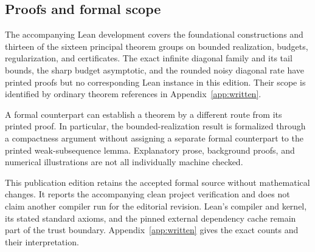 \documentclass[11pt]{article}
\begin{document}
\subsection*{Proofs and formal scope}
The accompanying Lean development covers the foundational constructions and thirteen of the sixteen principal theorem groups on bounded realization, budgets, regularization, and certificates. The exact infinite diagonal family and its tail bounds, the sharp budget asymptotic, and the rounded noisy diagonal rate have printed proofs but no corresponding Lean instance in this edition. Their scope is identified by ordinary theorem references in Appendix~\ref{app:written}.

A formal counterpart can establish a theorem by a different route from its printed proof. In particular, the bounded-realization result is formalized through a compactness argument without assigning a separate formal counterpart to the printed weak-subsequence lemma. Explanatory prose, background proofs, and numerical illustrations are not all individually machine checked.

This publication edition retains the accepted formal source without mathematical changes. It reports the accompanying clean project verification and does not claim another compiler run for the editorial revision. Lean's compiler and kernel, its stated standard axioms, and the pinned external dependency cache remain part of the trust boundary. Appendix~\ref{app:written} gives the exact counts and their interpretation.

\clearpage\begingroup\setlength{\parskip}{0pt}\tableofcontents\endgroup
\clearpage{}





















\appendix






\end{document}
